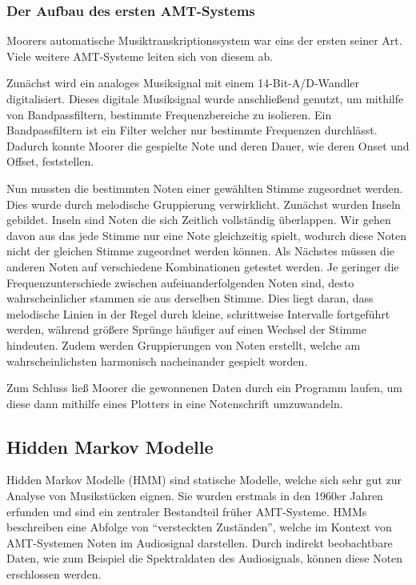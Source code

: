 \subsubsection{Der Aufbau des ersten AMT-Systems}
Moorers automatische Musiktranskriptionssystem war eins der ersten seiner Art.
Viele weitere AMT-Systeme leiten sich von diesem ab.

Zunächst wird ein analoges Musiksignal mit einem 14-Bit-A/D-Wandler digitalisiert.
Dieses digitale Musiksignal wurde anschließend genutzt, um mithilfe von Bandpassfiltern,
bestimmte Frequenzbereiche zu isolieren.
Ein Bandpassfiltern ist ein Filter welcher nur bestimmte Frequenzen durchlässt.
Dadurch konnte Moorer die gespielte Note und deren Dauer,
wie deren Onset und Offset, feststellen.

Nun mussten die bestimmten Noten einer gewählten Stimme zugeordnet werden.
Dies wurde durch melodische Gruppierung verwirklicht.
Zunächst wurden Inseln gebildet.
Inseln sind Noten die sich Zeitlich vollständig überlappen.
Wir gehen davon aus das jede Stimme nur eine Note gleichzeitig spielt,
wodurch diese Noten nicht der gleichen Stimme zugeordnet werden können.
Als Nächstes müssen die anderen Noten auf verschiedene Kombinationen getestet werden.
Je geringer die Frequenzunterschiede zwischen aufeinanderfolgenden Noten sind,
desto wahrscheinlicher stammen sie aus derselben Stimme.
Dies liegt daran, dass melodische Linien in der Regel durch kleine, schrittweise Intervalle fortgeführt werden,
während größere Sprünge häufiger auf einen Wechsel der Stimme hindeuten.
Zudem werden Gruppierungen von Noten erstellt, welche am wahrscheinlichsten harmonisch nacheinander gespielt worden.

Zum Schluss ließ Moorer die gewonnenen Daten durch ein Programm laufen, 
um diese dann mithilfe eines Plotters in eine Notenschrift umzuwandeln.

\subsection{Hidden Markov Modelle}\label{subsec:hiddenMarkov}
Hidden Markov Modelle (HMM) sind statische Modelle, welche sich sehr gut zur Analyse von Musikstücken eignen.
Sie wurden erstmals in den 1960er Jahren erfunden \cite{baum1970maximization} und
sind ein zentraler Bestandteil früher AMT-Systeme.
HMMs beschreiben eine Abfolge von \enquote{versteckten Zuständen},
welche im Kontext von AMT-Systemen Noten im Audiosignal darstellen.
Durch indirekt beobachtbare Daten, wie zum Beispiel die Spektraldaten des Audiosignals,
können diese Noten erschlossen werden.

